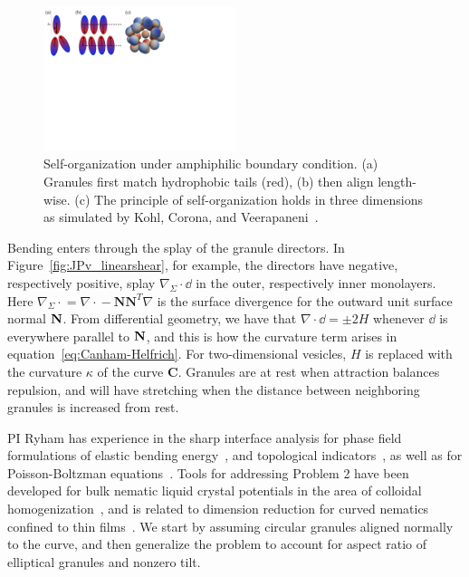 \begin{figure}
  \vspace{-5pt}
  \centerline{\includegraphics[width=0.5\textwidth]{figures/SA1Figures/AmphiphilicAssembly.pdf}}
  \vspace{-5pt}
  \caption{\label{fig:amphiphilic_assembly} Self-organization under
  amphiphilic boundary condition. (a) Granules first match hydrophobic
  tails (red), (b) then align length-wise. (c) The principle of
  self-organization holds in three dimensions as simulated by Kohl,
  Corona, and Veerapaneni~\cite{koh-cor-che-vee2021}.}
\end{figure}
Bending enters through the splay of the granule directors. In
Figure~\ref{fig:JPv_linearshear}, for example, the directors have
negative, respectively positive, splay $\nabla_{\Sigma} \cdot \dd$ in
the outer, respectively inner monolayers. Here $\nabla_{\Sigma}\cdot{} =
\nabla \cdot {} - \mathbf{N}\mathbf{N}^T \nabla$ is the surface
divergence for the outward unit surface normal $\mathbf{N}$. From differential
geometry, we have that $\nabla\cdot \dd = \pm 2H$ whenever $\dd$ is
everywhere parallel to $\mathbf{N}$, and this is how the curvature term arises
in equation~\eqref{eq:Canham-Helfrich}. For two-dimensional vesicles,
$H$ is replaced with the curvature $\kappa$ of the curve $\mathbf{C}$.
Granules are at rest when attraction balances repulsion, and will have
stretching when the distance between neighboring granules is increased
from rest.

PI Ryham has experience in the sharp interface analysis for phase field
formulations of elastic bending energy~\cite{0951-7715-18-3-016, Du05},
and topological indicators~\cite{DuEuler}, as well as for
Poisson-Boltzman equations~\cite{Lee2018, 1531-3492_2006_2_357}. Tools
for addressing Problem 2 have been developed for bulk nematic liquid
crystal potentials in the area of colloidal
homogenization~\cite{Canevari2019DesignOE, doi:10.1137/18M1163919,
doi:10.1137/18M1163919, BERLYAND200597, doi:10.1137/130910348}, and is
related to dimension reduction for curved nematics confined to thin
films~\cite{Golovaty2017DimensionRF, Golovaty2015DimensionRF,
doi:10.1142/S0218202516500470, FoFrLe07}. We start by assuming circular
granules aligned normally to the curve, and then generalize the problem
to account for aspect ratio of elliptical granules and nonzero tilt. 

